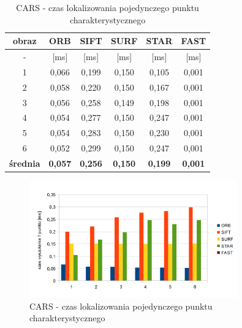 \begin{table}[htbp]
  \centering
  \caption{CARS - czas lokalizowania pojedynczego punktu charakterystycznego}
    \begin{tabular}{|c|c|c|c|c|c|}
    \hline
    obraz & \textbf{ORB} & \textbf{SIFT} & \textbf{SURF} & \textbf{STAR} & \textbf{FAST} \\
    \hline
    -  & [ms] & [ms] & [ms] & [ms] & [ms] \\\hline
    1 & 0,066 & 0,199 & 0,150 & 0,105 & 0,001 \\
    2 & 0,058 & 0,220 & 0,150 & 0,167 & 0,001 \\
    3 & 0,056 & 0,258 & 0,149 & 0,198 & 0,001 \\
    4 & 0,054 & 0,277 & 0,150 & 0,247 & 0,001 \\
    5 & 0,054 & 0,283 & 0,150 & 0,230 & 0,001 \\
    6 & 0,052 & 0,299 & 0,150 & 0,247 & 0,001 \\\hline
    \textbf{średnia} & \textbf{0,057} & \textbf{0,256} & \textbf{0,150} & \textbf{0,199} & \textbf{0,001} \\
    \hline
    \end{tabular}%
  \label{tab:cars_f2}%
\end{table}%


\begin{figure}
\centering
\includegraphics[width=0.8\textwidth]{pict/mikolajczyk/light/f2.png}
\caption{CARS - czas lokalizowania pojedynczego punktu charakterystycznego}
\label{fig:cars_f2}
\end{figure}

